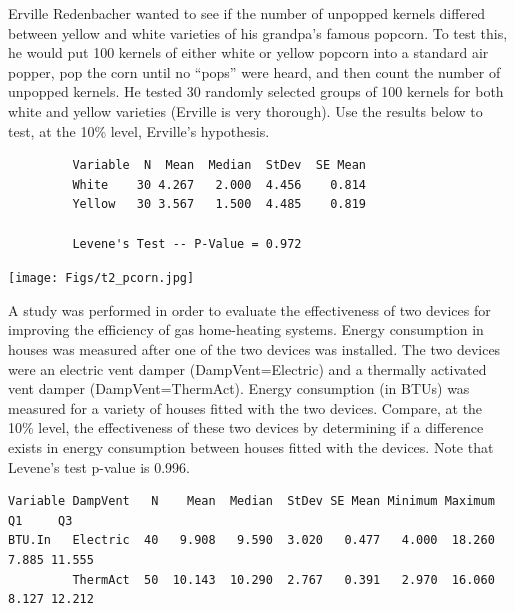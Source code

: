 \documentclass[10pt,openany]{book}\usepackage[]{graphicx}\usepackage[]{color}
\begin{document}
\begin{exsection}
  \item \label{revex:tTestPopcorn} Erville Redenbacher wanted to see if the number of unpopped kernels differed between yellow and white varieties of his grandpa's famous popcorn.  To test this, he would put 100 kernels of either white or yellow popcorn into a standard air popper, pop the corn until no ``pops'' were heard, and then count the number of unpopped kernels.  He tested 30 randomly selected groups of 100 kernels for both white and yellow varieties (Erville is very thorough).  Use the results below to test, at the 10\% level, Erville's hypothesis. 

  \begin{Verbatim}
         Variable  N  Mean  Median  StDev  SE Mean
         White    30 4.267   2.000  4.456    0.814
         Yellow   30 3.567   1.500  4.485    0.819

         Levene's Test -- P-Value = 0.972
  \end{Verbatim}
\begin{center}
    \texttt{[image: Figs/t2\_pcorn.jpg]}
\end{center}

  \item \label{revex:tTestHeatVent} A study was performed in order to evaluate the effectiveness of two devices for improving the efficiency of gas home-heating systems.  Energy consumption in houses was measured after one of the two devices was installed.  The two devices were an electric vent damper (DampVent=Electric) and a thermally activated vent damper (DampVent=ThermAct).  Energy consumption (in BTUs) was measured for a variety of houses fitted with the two devices.  Compare, at the 10\% level, the effectiveness of these two devices by determining if a difference exists in energy consumption between houses fitted with the devices.  Note that Levene's test p-value is 0.996. 
  \begin{Verbatim}
Variable DampVent   N    Mean  Median  StDev SE Mean Minimum Maximum     Q1     Q3
BTU.In   Electric  40   9.908   9.590  3.020   0.477   4.000  18.260  7.885 11.555
         ThermAct  50  10.143  10.290  2.767   0.391   2.970  16.060  8.127 12.212
  \end{Verbatim}


\end{exsection}
\end{document}
